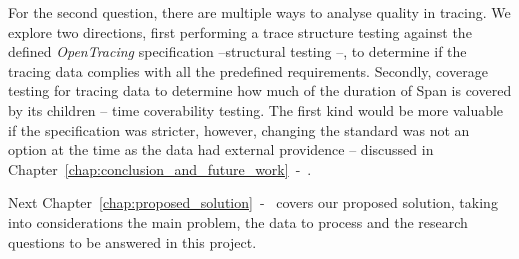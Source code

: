 For the second question, there are multiple ways to analyse quality in tracing. We explore two directions, first performing a trace structure testing against the defined \emph{OpenTracing} specification --structural testing --, to determine if the tracing data complies with all the predefined requirements. Secondly, coverage testing for tracing data to determine how much of the duration of Span is covered by its children -- time coverability testing. The first kind would be more valuable if the specification was stricter, however, changing the standard was not an option at the time as the data had external providence -- discussed in Chapter~\ref{chap:conclusion_and_future_work}~-~.

Next Chapter~\ref{chap:proposed_solution}~-~ covers our proposed solution, taking into considerations the main problem, the data to process and the research questions to be answered in this project.

\checkoddpage
{}
{
    \newpage
    \blankpage
}
{
}
